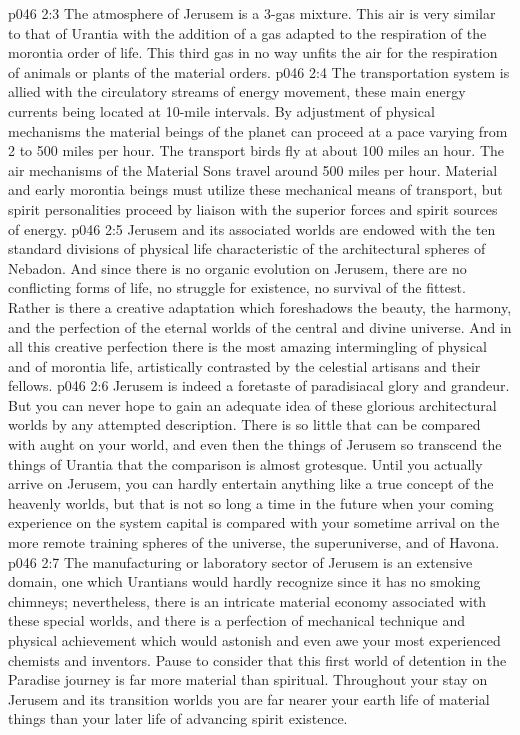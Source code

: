 \vs p046 2:3 The atmosphere of Jerusem is a 3\hyp{}gas mixture. This air is very similar to that of Urantia with the addition of a gas adapted to the respiration of the morontia order of life. This third gas in no way unfits the air for the respiration of animals or plants of the material orders.
\vs p046 2:4 The transportation system is allied with the circulatory streams of energy movement, these main energy currents being located at 10\hyp{}mile intervals. By adjustment of physical mechanisms the material beings of the planet can proceed at a pace varying from 2 to 500 miles per hour. The transport birds fly at about 100 miles an hour. The air mechanisms of the Material Sons travel around 500 miles per hour. Material and early morontia beings must utilize these mechanical means of transport, but spirit personalities proceed by liaison with the superior forces and spirit sources of energy.
\vs p046 2:5 \pc Jerusem and its associated worlds are endowed with the ten standard divisions of physical life characteristic of the architectural spheres of Nebadon. And since there is no organic evolution on Jerusem, there are no conflicting forms of life, no struggle for existence, no survival of the fittest. Rather is there a creative adaptation which foreshadows the beauty, the harmony, and the perfection of the eternal worlds of the central and divine universe. And in all this creative perfection there is the most amazing intermingling of physical and of morontia life, artistically contrasted by the celestial artisans and their fellows.
\vs p046 2:6 Jerusem is indeed a foretaste of paradisiacal glory and grandeur. But you can never hope to gain an adequate idea of these glorious architectural worlds by any attempted description. There is so little that can be compared with aught on your world, and even then the things of Jerusem so transcend the things of Urantia that the comparison is almost grotesque. Until you actually arrive on Jerusem, you can hardly entertain anything like a true concept of the heavenly worlds, but that is not so long a time in the future when your coming experience on the system capital is compared with your sometime arrival on the more remote training spheres of the universe, the superuniverse, and of Havona.
\vs p046 2:7 \pc The manufacturing or laboratory sector of Jerusem is an extensive domain, one which Urantians would hardly recognize since it has no smoking chimneys; nevertheless, there is an intricate material economy associated with these special worlds, and there is a perfection of mechanical technique and physical achievement which would astonish and even awe your most experienced chemists and inventors. Pause to consider that this first world of detention in the Paradise journey is far more material than spiritual. Throughout your stay on Jerusem and its transition worlds you are far nearer your earth life of material things than your later life of advancing spirit existence.
